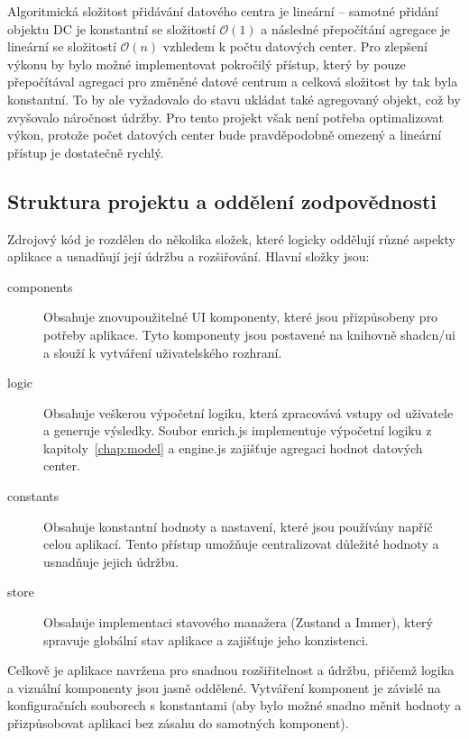 Algoritmická složitost přidávání datového centra je lineární -- samotné přidání objektu DC je konstantní se složitostí $\mathcal{O}(1)$ a následné přepočítání agregace je lineární se složitostí $\mathcal{O}(n)$ vzhledem k počtu datových center. Pro zlepšení výkonu by bylo možné implementovat pokročilý přístup, který by pouze přepočítával agregaci pro změněné datové centrum a celková složitost by tak byla konstantní. To by ale vyžadovalo do stavu ukládat také agregovaný objekt, což by zvyšovalo náročnost údržby. Pro tento projekt však není potřeba optimalizovat výkon, protože počet datových center bude pravděpodobně omezený a lineární přístup je dostatečně rychlý.

\subsection{Struktura projektu a oddělení zodpovědnosti}
\label{subsec:app_architektura_struktura}

Zdrojový kód je rozdělen do několika složek, které logicky oddělují různé aspekty aplikace a usnadňují její údržbu a rozšiřování. Hlavní složky jsou:

\begin{description}

	\item[components] Obsahuje znovupoužitelné UI komponenty, které jsou přizpůsobeny pro potřeby aplikace. Tyto komponenty jsou postavené na knihovně shadcn/ui a slouží k vytváření uživatelského rozhraní.
	
	\item[logic] Obsahuje veškerou výpočetní logiku, která zpracovává vstupy od uživatele a generuje výsledky. Soubor enrich.js implementuje výpočetní logiku z kapitoly~\ref{chap:model} a engine.js zajišťuje agregaci hodnot datových center.
	
	\item[constants] Obsahuje konstantní hodnoty a nastavení, které jsou používány napříč celou aplikací. Tento přístup umožňuje centralizovat důležité hodnoty a usnadňuje jejich údržbu.
	
	\item[store] Obsahuje implementaci stavového manažera (Zustand a Immer), který spravuje globální stav aplikace a zajišťuje jeho konzistenci.
	
\end{description}

Celkově je aplikace navržena pro snadnou rozšiřitelnost a údržbu, přičemž logika a vizuální komponenty jsou jasně oddělené. Vytváření komponent je závislé na konfiguračních souborech s konstantami (aby bylo možné snadno měnit hodnoty a přizpůsobovat aplikaci bez zásahu do samotných komponent).

